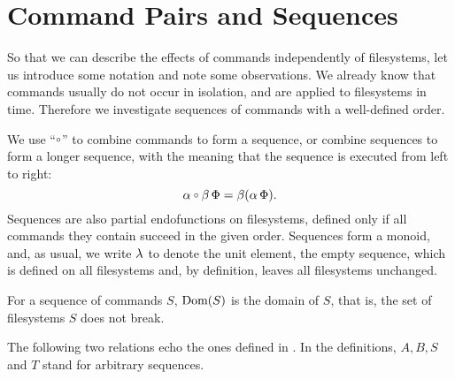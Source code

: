 

\section{Command Pairs and Sequences}


So that we can describe the effects of commands independently of filesystems,
let us introduce some notation
and note some observations.
We already know that
commands usually do not occur in isolation,
and are applied to filesystems in time.
Therefore we investigate sequences of commands with a well-defined order.
\begin{mydef}
We use ``$\cc$'' to combine commands to form a sequence, or combine sequences to form a longer sequence,
with the meaning that the sequence is executed from left to right:
\[ \alpha\cc\beta\aFS = \beta(\alpha\aFS). \]
Sequences are also partial endofunctions on filesystems,
defined only if all commands they contain succeed in the given order.
Sequences form a monoid, and, as usual,
we write $\lambda$ to denote the unit element, the empty sequence,
which is defined on all filesystems and, by definition, leaves all filesystems unchanged.
\end{mydef}

\begin{mydef}[$\Dom{S}$]
For a sequence of commands $S$, $\Dom{S}$ is the domain of $S$, that is,
the set of filesystems $S$ does not break.
\end{mydef}


The following two relations 
echo the ones defined in \cite{NREC}.
In the definitions, $A,B,S$ and $T$ stand for arbitrary sequences.


